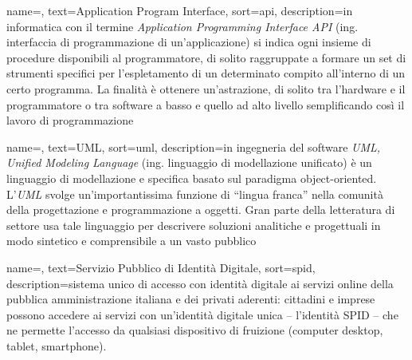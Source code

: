 
\renewcommand{\acronymname}{Acronimi e abbreviazioni}







{
    name=,
    text=Application Program Interface,
    sort=api,
    description={in informatica con il termine \emph{Application Programming Interface API} (ing. interfaccia di programmazione di un'applicazione) si indica ogni insieme di procedure disponibili al programmatore, di solito raggruppate a formare un set di strumenti specifici per l'espletamento di un determinato compito all'interno di un certo programma. La finalità è ottenere un'astrazione, di solito tra l'hardware e il programmatore o tra software a basso e quello ad alto livello semplificando così il lavoro di programmazione}
}

{
    name=,
    text=UML,
    sort=uml,
    description={in ingegneria del software \emph{UML, Unified Modeling Language} (ing. linguaggio di modellazione unificato) è un linguaggio di modellazione e specifica basato sul paradigma object-oriented. L'\emph{UML} svolge un'importantissima funzione di ``lingua franca'' nella comunità della progettazione e programmazione a oggetti. Gran parte della letteratura di settore usa tale linguaggio per descrivere soluzioni analitiche e progettuali in modo sintetico e comprensibile a un vasto pubblico}
}

{
    name=,
    text=Servizio Pubblico di Identità Digitale,
    sort=spid,
    description={sistema unico di accesso con identità digitale ai servizi online della pubblica amministrazione italiana e dei privati aderenti: cittadini e imprese possono accedere ai servizi con un’identità digitale unica – l’identità SPID – che ne permette l’accesso da qualsiasi dispositivo di fruizione (computer desktop, tablet, smartphone).}
}

